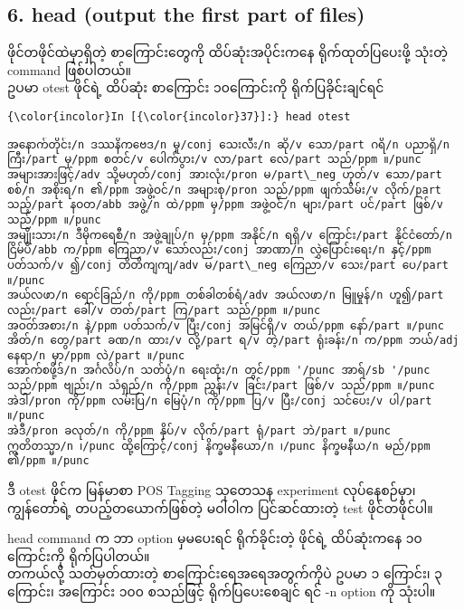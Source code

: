 \documentclass[11pt]{article}
\begin{document}
    \subsection{6. head (output the first part of
files)}\label{head-output-the-first-part-of-files}

ဖိုင်တဖိုင်ထဲမှာရှိတဲ့ စာကြောင်းတွေကို ထိပ်ဆုံးအပိုင်းကနေ
ရိုက်ထုတ်ပြပေးဖို့ သုံးတဲ့ command ဖြစ်ပါတယ်။\\
ဥပမာ otest ဖိုင်ရဲ့ ထိပ်ဆုံး စာကြောင်း ၁၀ကြောင်းကို ရိုက်ပြခိုင်းချင်ရင်

    \begin{Verbatim}[commandchars=\\\{\}]
{\color{incolor}In [{\color{incolor}37}]:} head otest
\end{Verbatim}

    \begin{Verbatim}[commandchars=\\\{\}]
အနောက်တိုင်း/n ဒဿနိကဗေဒ/n မူ/conj သေးလီး/n ဆို/v သော/part ဂရိ/n ပညာရှိ/n ကြီး/part မှ/ppm စတင်/v ပေါက်ပွား/v လာ/part လေ/part သည်/ppm ။/punc
အများအားဖြင့်/adv သို့မဟုတ်/conj အားလုံး/pron မ/part\_neg ဟုတ်/v သော/part စစ်/n အစိုးရ/n ၏/ppm အဖွဲ့ဝင်/n အများစု/pron သည်/ppm ဖျက်သိမ်း/v လိုက်/part သည့်/part နဝတ/abb အဖွဲ့/n ထဲ/ppm မှ/ppm အဖွဲ့ဝင်/n များ/part ပင်/part ဖြစ်/v သည်/ppm ။/punc
အမျိုးသား/n ဒီမိုကရေစီ/n အဖွဲ့ချုပ်/n မှ/ppm အနိုင်/n ရရှိ/v ကြောင်း/part နိုင်ငံတော်/n ငြိမ်ပိ/abb က/ppm ကြေညာ/v သော်လည်း/conj အာဏာ/n လွှဲပြောင်းရေး/n နှင့်/ppm ပတ်သက်/v ၍/conj တိတိကျကျ/adv မ/part\_neg ကြေညာ/v သေး/part ပေ/part ။/punc
အယ်လဖာ/n ရောင်ခြည်/n ကို/ppm တစ်ခါတစ်ရံ/adv အယ်လဖာ/n မြူမှုန်/n ဟူ၍/part လည်း/part ခေါ်/v တတ်/part ကြ/part သည်/ppm ။/punc
အဝတ်အစား/n နဲ့/ppm ပတ်သက်/v ပြီး/conj အမြင်ရှိ/v တယ်/ppm နော်/part ။/punc
အိတ်/n တွေ/part ခဏ/n ထား/v လို့/part ရ/v တဲ့/part ရုံးခန်း/n က/ppm ဘယ်/adj နေရာ/n မှာ/ppm လဲ/part ။/punc
အောက်စဖို့ဒ်/n အင်္ဂလိပ်/n သတ်ပုံ/n ရေးထုံး/n တွင်/ppm '/punc အာရ်/sb '/punc သည်/ppm ဗျည်း/n သံရှည်/n ကို/ppm ညွှန်း/v ခြင်း/part ဖြစ်/v သည်/ppm ။/punc
အဲဒါ/pron ကို/ppm လမ်းပြ/n မြေပုံ/n ကို/ppm ပြ/v ပြီး/conj သင်ပေး/v ပါ/part ။/punc
အဲဒီ/pron ခလုတ်/n ကို/ppm နှိပ်/v လိုက်/part ရုံ/part ဘဲ/part ။/punc
ဣတိတသ္မာ/n ၊/punc ထို့ကြောင့်/conj နိက္ခမနီယော/n ၊/punc နိက္ခမနီယ/n မည်/ppm ၏/ppm ။/punc

    \end{Verbatim}

    ဒီ otest ဖိုင်က မြန်မာစာ POS Tagging သုတေသန experiment လုပ်နေစဉ်မှာ၊
ကျွန်တော်ရဲ့ တပည့်တယောက်ဖြစ်တဲ့ မဝါဝါက ပြင်ဆင်ထားတဲ့ test ဖိုင်တဖိုင်ပါ။

head command က ဘာ option မှမပေးရင် ရိုက်ခိုင်းတဲ့ ဖိုင်ရဲ့ ထိပ်ဆုံးကနေ
၁၀ ကြောင်းကို ရိုက်ပြပါတယ်။\\
တကယ်လို့ သတ်မှတ်ထားတဲ့ စာကြောင်းရေအရေအတွက်ကိုပဲ ဥပမာ ၁ ကြောင်း၊ ၃
ကြောင်း၊ အကြောင်း ၁၀၀ စသည်ဖြင့် ရိုက်ပြပေးစေချင် ရင် -n option ကို
သုံးပါ။
\end{document}
